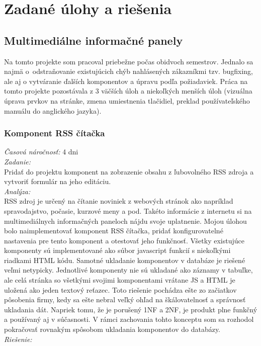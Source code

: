 \documentclass[11pt, oneside]{report}
\begin{document}
\chapter{Zadané úlohy a riešenia}
\section{Multimediálne informačné panely}
Na tomto projekte som pracoval  priebežne počas  obidvoch semestrov. Jednalo sa najmä o~odstraňovanie existujúcich chýb nahlásených zákazníkmi tzv. bugfixing, ale aj o vytváranie ďalších komponentov a úpravu podľa požiadaviek. Práca na tomto projekte pozostávala z 3 väčších úloh  a  niekoľkých menších úloh (vizuálna úprava prvkov na stránke, zmena umiestnenia tlačidiel, preklad používateľského manuálu do anglického jazyka).
\subsection{Komponent RSS čítačka}
\textit{Časová náročnosť:} 4 dni\\
\textit{Zadanie:}\\
Pridať do projektu  komponent na zobrazenie obsahu z ľubovolného RSS zdroja a vytvoriť formulár na jeho editáciu.
\\\textit{Analýza:}\\
 RSS zdroj   je určený na čítanie noviniek  z webových stránok ako napríklad spravodajstvo, počasie, kurzové meny a pod. Takéto informácie  z internetu si na multimediálnych informačných paneloch nájdu svoje uplatnenie. Mojou úlohou bolo naimplementovať komponent RSS čítačka, pridať  konfigurovatelné nastavenia pre tento komponent a otestovať jeho funkčnosť.
Všetky existujúce komponenty sú implementované ako súbor javascript funkcií s niekoľkými riadkami HTML kódu. Samotné ukladanie komponentov v databáze je riešené veľmi netypicky. Jednotlivé komponenty nie sú ukladané ako záznamy v tabuľke, ale celá stránka  so všetkými svojimi komponentami vrátane JS a HTML je uložená ako jeden textový reťazec. Toto riešenie  pochádza ešte zo začiatkov pôsobenia firmy, kedy sa ešte nebral veľký ohľad na  škálovatelnosť a  správnosť ukladania dát. 
Napriek tomu, že je porušený 1NF a 2NF, je produkt plne funkčný a používaný aj v súčasnosti. V rámci zachovania tohto konceptu som sa rozhodol pokračovať rovnakým spôsobom ukladania komponentov do databázy.
\\\textit{Riešenie:}\\
\end{document}
